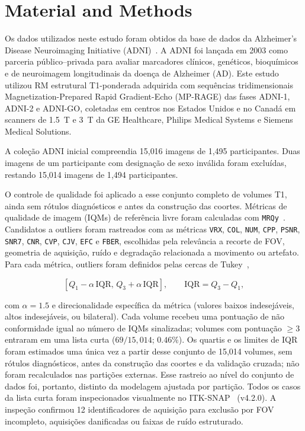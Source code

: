 \documentclass[review]{elsarticle}
\newcommand{\code}[1]{\texttt{#1}}
\begin{document}

\section{Material and Methods}\label{sec:Material-and-Methods}

	Os dados utilizados neste estudo foram obtidos da base de dados da Alzheimer's Disease Neuroimaging Initiative (ADNI)~\cite{petersen-2009,jr-2008}.
	A ADNI foi lançada em 2003 como parceria público--privada para avaliar marcadores clínicos, genéticos, bioquímicos e de neuroimagem longitudinais da doença de Alzheimer (AD).
	Este estudo utilizou RM estrutural T1-ponderada adquirida com sequências tridimensionais Magnetization-Prepared Rapid Gradient-Echo (MP-RAGE) das fases ADNI-1, ADNI-2 e ADNI-GO, coletadas em centros nos Estados Unidos e no Canadá em scanners de 1.5~T e 3~T da GE Healthcare, Philips Medical Systems e Siemens Medical Solutions.
		
	A coleção ADNI inicial compreendia 15{,}016 imagens de 1{,}495 participantes.
	Duas imagens de um participante com designação de sexo inválida foram excluídas, restando 15{,}014 imagens de 1{,}494 participantes.
		
	O controle de qualidade foi aplicado a esse conjunto completo de volumes T1, ainda sem rótulos diagnósticos e antes da construção das coortes.
	Métricas de qualidade de imagem (IQMs) de referência livre foram calculadas com \code{MRQy}~\citep{sadri-2020}.
	Candidatos a outliers foram rastreados com as métricas \code{VRX}, \code{COL}, \code{NUM}, \code{CPP}, \code{PSNR}, \code{SNR7}, \code{CNR}, \code{CVP}, \code{CJV}, \code{EFC} e \code{FBER}, escolhidas pela relevância a recorte de FOV, geometria de aquisição, ruído e degradação relacionada a movimento ou artefato.
	Para cada métrica, outliers foram definidos pelas cercas de Tukey~\citep{tukey-1977},
	
	\begin{equation}
		\left[Q_1 - \alpha\,\mathrm{IQR},\, Q_3 + \alpha\,\mathrm{IQR}\right],
		\qquad \mathrm{IQR} = Q_3 - Q_1,
		\label{eq:tukey}
	\end{equation}
	
	com $\alpha = 1.5$ e direcionalidade específica da métrica (valores baixos indesejáveis, altos indesejáveis, ou bilateral).
	Cada volume recebeu uma pontuação de não conformidade igual ao número de IQMs sinalizadas; volumes com pontuação $\geq 3$ entraram em uma lista curta ($69/15{,}014$; $0.46\%$).
	Os quartis e os limites de IQR foram estimados uma única vez a partir desse conjunto de 15{,}014 volumes, sem rótulos diagnósticos, antes da construção das coortes e da validação cruzada; não foram recalculados nas partições externas.
	Esse rastreio ao nível do conjunto de dados foi, portanto, distinto da modelagem ajustada por partição.
	Todos os casos da lista curta foram inspecionados visualmente no ITK-SNAP~\citep{yushkevich-2006} (v4.2.0).
	A inspeção confirmou 12 identificadores de aquisição para exclusão por FOV incompleto, aquisições danificadas ou faixas de ruído estruturado.
	
\end{document}
